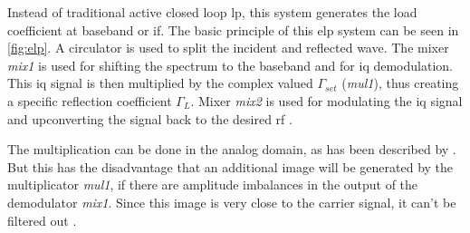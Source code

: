 \documentclass[12pt,a4paper,parskip=full,abstract=true,BCOR=12mm,twoside,open=right]{scrreprt}
\def\device#1{\textit{#1}}
\begin{document}
Instead of traditional active closed loop \gls{lp}, this system generates the
load coefficient at baseband or \gls{if}. The basic principle of this \gls{elp} system
can be seen in \cref{fig:elp}. A circulator is used to split the incident and
reflected wave. The mixer \device{mix1} is used for shifting the spectrum to
the baseband and for \gls{iq} demodulation. This \gls{iq} signal is then
multiplied by the complex valued $\Gamma_{set}$ (\device{mul1}), thus creating a specific
reflection coefficient $\Gamma_L$. Mixer \device{mix2} is used for modulating
the \gls{iq} signal and upconverting the signal back to the desired \gls{rf} \cite{williams_experimental_2005}.

The multiplication can be done in the analog domain, as has been described
by \cite{williams_experimental_2005}. But this has the disadvantage that
an additional image will be generated by the multiplicator \device{mul1},
if there are amplitude imbalances in the output
of the demodulator \device{mix1}. Since this image is very close to the
carrier signal, it can't be filtered out \cite{hashmi_agile_2010}.
\end{document}
